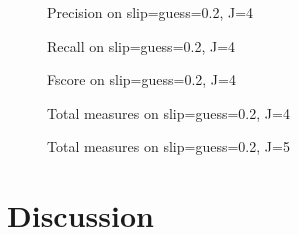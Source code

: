 \documentclass{edm_template}
\begin{document}
\begin{figure}[h!]
  \begin{center}
  
  \end{center}
  \caption{Precision on slip=guess=0.2, J=4}  
  \label{fig:theta02J4Precision}
\end{figure}

\begin{figure}[h!]
  \begin{center}
  
  \end{center}
  \caption{Recall on slip=guess=0.2, J=4}  
  \label{fig:theta02J4Recall}
\end{figure}

\begin{figure}[h!]
  \begin{center}
  
  \end{center}
  \caption{Fscore on slip=guess=0.2, J=4}  
  \label{fig:theta02J4Fscore}
\end{figure}

\begin{figure}[h!]
  \begin{center}
  
  \end{center}
  \caption{Total measures on slip=guess=0.2, J=4}  
  \label{fig:theta02J4test}
\end{figure}

\begin{figure}[h!]
  \begin{center}
  
  \end{center}
  \caption{Total measures on slip=guess=0.2, J=5}  
  \label{fig:theta02J5test}
\end{figure}


%  

\section{Discussion}



\end{document}
